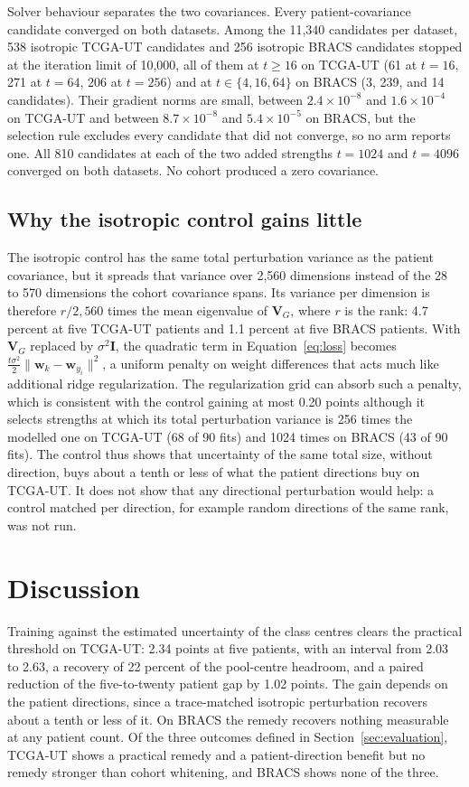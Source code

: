 Solver behaviour separates the two covariances. Every patient-covariance candidate converged on both datasets. Among the 11,340 candidates per dataset, 538 isotropic TCGA-UT candidates and 256 isotropic BRACS candidates stopped at the iteration limit of 10,000, all of them at $t\geq16$ on TCGA-UT (61 at $t=16$, 271 at $t=64$, 206 at $t=256$) and at $t\in\{4,16,64\}$ on BRACS (3, 239, and 14 candidates). Their gradient norms are small, between $2.4\times10^{-8}$ and $1.6\times10^{-4}$ on TCGA-UT and between $8.7\times10^{-8}$ and $5.4\times10^{-5}$ on BRACS, but the selection rule excludes every candidate that did not converge, so no arm reports one. All 810 candidates at each of the two added strengths $t=1024$ and $t=4096$ converged on both datasets. No cohort produced a zero covariance.

\subsection{Why the isotropic control gains little}
\label{sec:isotropic-results}
The isotropic control has the same total perturbation variance as the patient covariance, but it spreads that variance over 2,560 dimensions instead of the 28 to 570 dimensions the cohort covariance spans. Its variance per dimension is therefore $r/2{,}560$ times the mean eigenvalue of $\mathbf V_G$, where $r$ is the rank: 4.7 percent at five TCGA-UT patients and 1.1 percent at five BRACS patients. With $\mathbf V_G$ replaced by $\sigma^2\mathbf I$, the quadratic term in Equation~\ref{eq:loss} becomes $\tfrac{t\sigma^2}{2}\lVert\mathbf w_k-\mathbf w_{y_i}\rVert^2$, a uniform penalty on weight differences that acts much like additional ridge regularization. The regularization grid can absorb such a penalty, which is consistent with the control gaining at most 0.20 points although it selects strengths at which its total perturbation variance is 256 times the modelled one on TCGA-UT (68 of 90 fits) and 1024 times on BRACS (43 of 90 fits). The control thus shows that uncertainty of the same total size, without direction, buys about a tenth or less of what the patient directions buy on TCGA-UT. It does not show that any directional perturbation would help: a control matched per direction, for example random directions of the same rank, was not run.

\section{Discussion}
\label{sec:discussion}
Training against the estimated uncertainty of the class centres clears the practical threshold on TCGA-UT: 2.34 points at five patients, with an interval from 2.03 to 2.63, a recovery of 22 percent of the pool-centre headroom, and a paired reduction of the five-to-twenty patient gap by 1.02 points. The gain depends on the patient directions, since a trace-matched isotropic perturbation recovers about a tenth or less of it. On BRACS the remedy recovers nothing measurable at any patient count. Of the three outcomes defined in Section~\ref{sec:evaluation}, TCGA-UT shows a practical remedy and a patient-direction benefit but no remedy stronger than cohort whitening, and BRACS shows none of the three.

